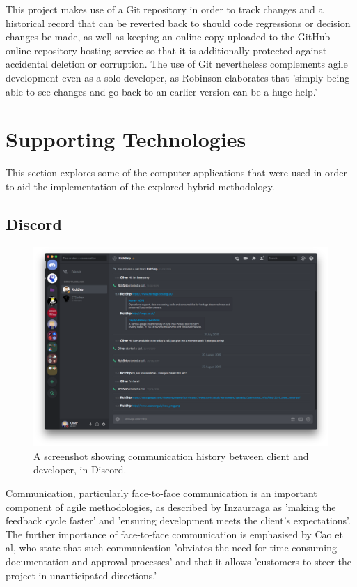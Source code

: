 This project makes use of a Git repository in order to track changes and a historical record that can be reverted back to should code regressions or decision changes be made, as well as keeping an online copy uploaded to the GitHub online repository hosting service so that it is additionally protected against accidental deletion or corruption. The use of Git nevertheless complements agile development even as a solo developer, as Robinson elaborates that 'simply being able to see changes and go back to an earlier version can be a huge help.' \cite{Robinson1}

\section{Supporting Technologies}
This section explores some of the computer applications that were used in order to aid the implementation of the explored hybrid methodology.

\subsection{Discord}
\begin{figure}[!ht]
    \includegraphics[width=\textwidth]{Figures/discord}
    \caption{A screenshot showing communication history between client and developer, in Discord.}
    \label{fig:discord1}
\end{figure}

Communication, particularly face-to-face communication is an important component of agile methodologies, as described by Inzaurraga as 'making the feedback cycle faster' and 'ensuring development meets the client's expectations'. \cite{Inzaurraga1} The further importance of face-to-face communication is emphasised by Cao et al, who state that such communication 'obviates the need for time-consuming documentation and approval processes' and that it allows 'customers to steer the project in unanticipated directions.' \cite{4420071}

